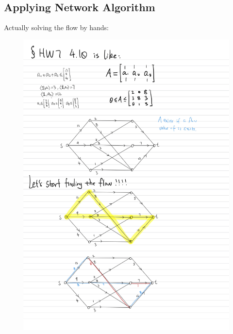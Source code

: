 \documentclass[]{article}
\theoremstyle{definition}
\begin{document}
    \subsection{Applying Network Algorithm}
        Actually solving the flow by hands:
        \begin{figure}
            \centering
            \includegraphics[width=14cm]{Settled Results Ready to Transfer-5.jpg}
        \end{figure}
\end{document}
